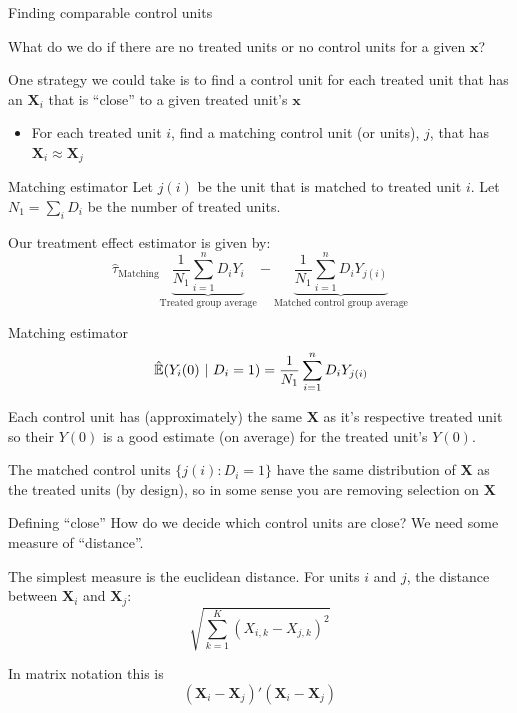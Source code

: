 \documentclass[aspectratio=169,t,11pt,table]{beamer}
\begin{document}
\begin{frame}{Finding comparable control units}
  \begin{center}
    What do we do if there are no treated units or no control units for a given $\bm{x}$?
  \end{center}

  \bigskip
  One strategy we could take is to find a control unit for each treated unit that has an $\bm{X}_i$ that is ``close'' to a given treated unit's $\bm{x}$
  \begin{itemize}
    \item For each treated unit $i$, find a matching control unit (or units), $j$, that has $\bm{X}_i \approx \bm{X}_j$
  \end{itemize}
\end{frame}

\begin{frame}{Matching estimator}
  Let $j(i)$ be the unit that is matched to treated unit $i$. Let $N_1 = \sum_i D_i$ be the number of treated units. 
  
  \bigskip 
  Our treatment effect estimator is given by:
  $$
    \hat{\tau}_{\text{Matching}}
    \underbrace{\frac{1}{N_1} \sum_{i = 1}^n D_i Y_i}_{\text{Treated group average}} -
    \underbrace{\frac{1}{N_1} \sum_{i = 1}^n D_i Y_{j(i)}}_{\text{Matched control group average}}
  $$
\end{frame}

\begin{frame}{Matching estimator}
  $$
    \expechat{Y_i(0)}{D_i = 1} = \frac{1}{N_1} \sum_{i = 1}^n D_i Y_{j(i)}
  $$

  \bigskip
  Each control unit has (approximately) the same $\bm{X}$ as it's respective treated unit so their $Y(0)$ is a good estimate (on average) for the treated unit's $Y(0)$.
    
  \pause
  \bigskip
  The matched control units $\{ j(i): D_i = 1 \}$ have the same distribution of $\bm{X}$ as the treated units (by design), so in some sense you are removing selection on $\bm{X}$
\end{frame}

\begin{frame}{Defining ``close''}
  How do we decide which control units are close? We need some measure of ``distance''. 

  \bigskip
  The simplest measure is the \alert{euclidean distance}. For units $i$ and $j$, the distance between $\bm{X}_i$ and $\bm{X}_j$:
  $$
    \sqrt{\sum_{k = 1}^K (X_{i,k} - X_{j, k})^2}
  $$

  \pause 
  \bigskip
  In matrix notation this is 
  $$
    (\bm{X}_i - \bm{X}_j)' (\bm{X}_i - \bm{X}_j)
  $$
\end{frame}
\end{document}
